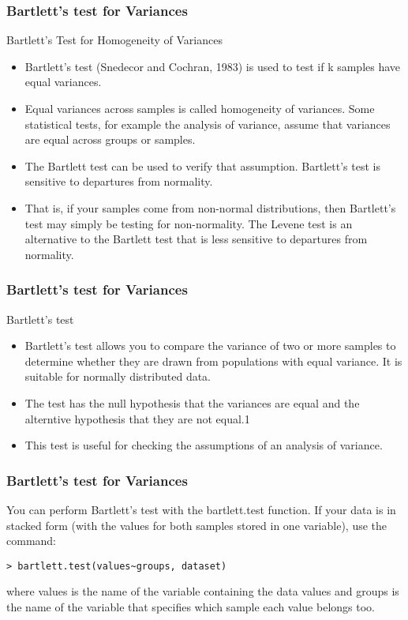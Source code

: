 \begin{frame}[fragile]
	\frametitle{Bartlett’s test for Variances}
	
	Bartlett's Test for Homogeneity of Variances
\begin{itemize}
\item Bartlett's test (Snedecor and Cochran, 1983) is used to test if k samples have equal variances. 
\item Equal variances across samples is called homogeneity of variances. 
Some statistical tests, for example the analysis of variance, assume that variances are equal across groups or samples. 
\item The Bartlett test can be used to verify that assumption.
Bartlett's test is sensitive to departures from normality. 
\item That is, if your samples come from non-normal distributions, then Bartlett's test may simply be testing for non-normality. The Levene test is an alternative to the Bartlett test that is less sensitive to departures from normality.
\end{itemize}	

\end{frame}
\begin{frame}[fragile]
\frametitle{Bartlett’s test for Variances}
Bartlett’s test
\begin{itemize}
\item Bartlett’s test allows you to compare the variance of two or more samples to determine whether they are drawn from populations with equal variance. It is suitable for normally distributed data. 
\item The test has the null hypothesis that the variances are equal and the alterntive hypothesis that they are not equal.1
\item This test is useful for checking the assumptions of an analysis of variance.
\end{itemize}

\end{frame}
\begin{frame}[fragile]
	\frametitle{Bartlett’s test for Variances}
	You can perform Bartlett’s test with the bartlett.test function. If your data is in stacked form (with the values for both samples stored in one variable), use the command:
\begin{framed}
\begin{verbatim}
> bartlett.test(values~groups, dataset)
\end{verbatim}
\end{framed}
where values is the name of the variable containing the data values and groups is the name of the variable that specifies which sample each value belongs too.
\end{frame}

